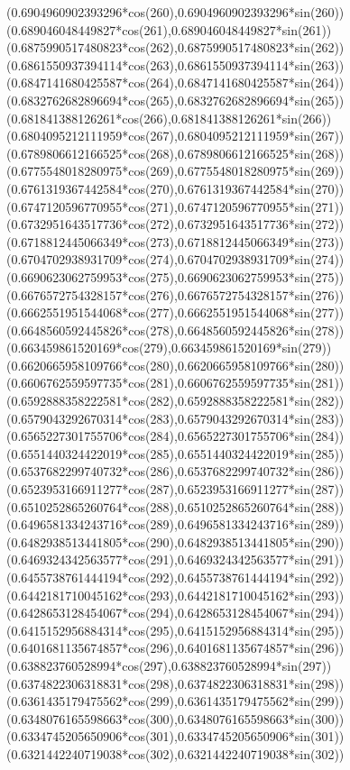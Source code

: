 {({0.6904960902393296*cos(260)},{0.6904960902393296*sin(260)})
({0.689046048449827*cos(261)},{0.689046048449827*sin(261)})
({0.6875990517480823*cos(262)},{0.6875990517480823*sin(262)})
({0.6861550937394114*cos(263)},{0.6861550937394114*sin(263)})
({0.6847141680425587*cos(264)},{0.6847141680425587*sin(264)})
({0.6832762682896694*cos(265)},{0.6832762682896694*sin(265)})
({0.681841388126261*cos(266)},{0.681841388126261*sin(266)})
({0.6804095212111959*cos(267)},{0.6804095212111959*sin(267)})
({0.6789806612166525*cos(268)},{0.6789806612166525*sin(268)})
({0.6775548018280975*cos(269)},{0.6775548018280975*sin(269)})
({0.6761319367442584*cos(270)},{0.6761319367442584*sin(270)})
({0.6747120596770955*cos(271)},{0.6747120596770955*sin(271)})
({0.6732951643517736*cos(272)},{0.6732951643517736*sin(272)})
({0.6718812445066349*cos(273)},{0.6718812445066349*sin(273)})
({0.6704702938931709*cos(274)},{0.6704702938931709*sin(274)})
({0.6690623062759953*cos(275)},{0.6690623062759953*sin(275)})
({0.6676572754328157*cos(276)},{0.6676572754328157*sin(276)})
({0.6662551951544068*cos(277)},{0.6662551951544068*sin(277)})
({0.6648560592445826*cos(278)},{0.6648560592445826*sin(278)})
({0.663459861520169*cos(279)},{0.663459861520169*sin(279)})
({0.6620665958109766*cos(280)},{0.6620665958109766*sin(280)})
({0.6606762559597735*cos(281)},{0.6606762559597735*sin(281)})
({0.6592888358222581*cos(282)},{0.6592888358222581*sin(282)})
({0.6579043292670314*cos(283)},{0.6579043292670314*sin(283)})
({0.6565227301755706*cos(284)},{0.6565227301755706*sin(284)})
({0.6551440324422019*cos(285)},{0.6551440324422019*sin(285)})
({0.6537682299740732*cos(286)},{0.6537682299740732*sin(286)})
({0.6523953166911277*cos(287)},{0.6523953166911277*sin(287)})
({0.6510252865260764*cos(288)},{0.6510252865260764*sin(288)})
({0.6496581334243716*cos(289)},{0.6496581334243716*sin(289)})
({0.6482938513441805*cos(290)},{0.6482938513441805*sin(290)})
({0.6469324342563577*cos(291)},{0.6469324342563577*sin(291)})
({0.6455738761444194*cos(292)},{0.6455738761444194*sin(292)})
({0.6442181710045162*cos(293)},{0.6442181710045162*sin(293)})
({0.6428653128454067*cos(294)},{0.6428653128454067*sin(294)})
({0.6415152956884314*cos(295)},{0.6415152956884314*sin(295)})
({0.6401681135674857*cos(296)},{0.6401681135674857*sin(296)})
({0.638823760528994*cos(297)},{0.638823760528994*sin(297)})
({0.6374822306318831*cos(298)},{0.6374822306318831*sin(298)})
({0.6361435179475562*cos(299)},{0.6361435179475562*sin(299)})
({0.6348076165598663*cos(300)},{0.6348076165598663*sin(300)})
({0.6334745205650906*cos(301)},{0.6334745205650906*sin(301)})
({0.6321442240719038*cos(302)},{0.6321442240719038*sin(302)})
}
